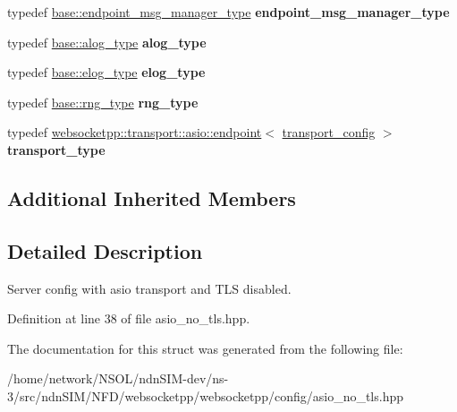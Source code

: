 \begin{DoxyCompactItemize}
\item 
typedef \hyperlink{classwebsocketpp_1_1message__buffer_1_1alloc_1_1endpoint__msg__manager}{base\+::endpoint\+\_\+msg\+\_\+manager\+\_\+type} {\bfseries endpoint\+\_\+msg\+\_\+manager\+\_\+type}\hypertarget{structwebsocketpp_1_1config_1_1asio_a5cc654513cddc3bc7d15ed37b2427150}{}\label{structwebsocketpp_1_1config_1_1asio_a5cc654513cddc3bc7d15ed37b2427150}

\item 
typedef \hyperlink{classwebsocketpp_1_1log_1_1basic}{base\+::alog\+\_\+type} {\bfseries alog\+\_\+type}\hypertarget{structwebsocketpp_1_1config_1_1asio_a128280d7b2ff8256e10f23050a89549d}{}\label{structwebsocketpp_1_1config_1_1asio_a128280d7b2ff8256e10f23050a89549d}

\item 
typedef \hyperlink{structwebsocketpp_1_1config_1_1core_ac037ffb73b675a6251f3b86433b4eb17}{base\+::elog\+\_\+type} {\bfseries elog\+\_\+type}\hypertarget{structwebsocketpp_1_1config_1_1asio_a67f2a92d70443a37f25ffbc08a6a9c3d}{}\label{structwebsocketpp_1_1config_1_1asio_a67f2a92d70443a37f25ffbc08a6a9c3d}

\item 
typedef \hyperlink{structwebsocketpp_1_1config_1_1core_a245db33d05f7994d221db66f506ab8c6}{base\+::rng\+\_\+type} {\bfseries rng\+\_\+type}\hypertarget{structwebsocketpp_1_1config_1_1asio_afb20244eb1c988b20a5821ec04ac4f80}{}\label{structwebsocketpp_1_1config_1_1asio_afb20244eb1c988b20a5821ec04ac4f80}

\item 
typedef \hyperlink{classwebsocketpp_1_1transport_1_1asio_1_1endpoint}{websocketpp\+::transport\+::asio\+::endpoint}$<$ \hyperlink{structwebsocketpp_1_1config_1_1asio_1_1transport__config}{transport\+\_\+config} $>$ {\bfseries transport\+\_\+type}\hypertarget{structwebsocketpp_1_1config_1_1asio_af600118e4ba565fa6e5063490e9e7047}{}\label{structwebsocketpp_1_1config_1_1asio_af600118e4ba565fa6e5063490e9e7047}

\end{DoxyCompactItemize}
\subsection*{Additional Inherited Members}


\subsection{Detailed Description}
Server config with asio transport and T\+LS disabled. 

Definition at line 38 of file asio\+\_\+no\+\_\+tls.\+hpp.



The documentation for this struct was generated from the following file\+:\begin{DoxyCompactItemize}
\item 
/home/network/\+N\+S\+O\+L/ndn\+S\+I\+M-\/dev/ns-\/3/src/ndn\+S\+I\+M/\+N\+F\+D/websocketpp/websocketpp/config/asio\+\_\+no\+\_\+tls.\+hpp\end{DoxyCompactItemize}

